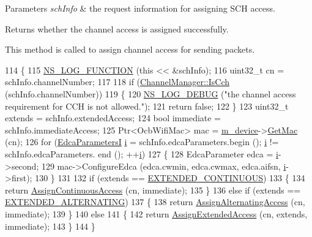 \begin{DoxyParams}{Parameters}
{\em sch\+Info} & the request information for assigning S\+CH access. \\
\hline
\end{DoxyParams}
\begin{DoxyReturn}{Returns}
whether the channel access is assigned successfully.
\end{DoxyReturn}
This method is called to assign channel access for sending packets. 
\begin{DoxyCode}
114 \{
115   \hyperlink{log-macros-disabled_8h_a90b90d5bad1f39cb1b64923ea94c0761}{NS\_LOG\_FUNCTION} (\textcolor{keyword}{this} << &schInfo);
116   uint32\_t cn = schInfo.channelNumber;
117 
118   \textcolor{keywordflow}{if} (\hyperlink{classns3_1_1ChannelManager_a3d68a3f8099eaa381bdfddac4b7ccfa6}{ChannelManager::IsCch} (schInfo.channelNumber))
119     \{
120       \hyperlink{group__logging_ga413f1886406d49f59a6a0a89b77b4d0a}{NS\_LOG\_DEBUG} (\textcolor{stringliteral}{"the channel access requirement for CCH is not allowed."});
121       \textcolor{keywordflow}{return} \textcolor{keyword}{false};
122     \}
123   uint32\_t extends = schInfo.extendedAccess;
124   \textcolor{keywordtype}{bool} immediate = schInfo.immediateAccess;
125   Ptr<OcbWifiMac> mac = \hyperlink{classns3_1_1ChannelScheduler_ac3d6c3071b8c796afb73789844968405}{m\_device}->\hyperlink{classns3_1_1WaveNetDevice_a899f670dd8eb023f0e40f19b536724eb}{GetMac} (cn);
126   \textcolor{keywordflow}{for} (\hyperlink{namespacens3_a0d8197f125c2e22b88fcd163ae1f30b1}{EdcaParametersI} \hyperlink{bernuolliDistribution_8m_a6f6ccfcf58b31cb6412107d9d5281426}{i} = schInfo.edcaParameters.begin (); \hyperlink{bernuolliDistribution_8m_a6f6ccfcf58b31cb6412107d9d5281426}{i} != schInfo.edcaParameters.
      end (); ++\hyperlink{bernuolliDistribution_8m_a6f6ccfcf58b31cb6412107d9d5281426}{i})
127     \{
128       EdcaParameter edca = \hyperlink{bernuolliDistribution_8m_a6f6ccfcf58b31cb6412107d9d5281426}{i}->second;
129       mac->ConfigureEdca (edca.cwmin, edca.cwmax, edca.aifsn, \hyperlink{bernuolliDistribution_8m_a6f6ccfcf58b31cb6412107d9d5281426}{i}->first);
130     \}
131 
132   \textcolor{keywordflow}{if} (extends == \hyperlink{channel-scheduler_8h_a51fe3e802b9451e2893d55d591047fc1}{EXTENDED\_CONTINUOUS})
133     \{
134       \textcolor{keywordflow}{return} \hyperlink{classns3_1_1ChannelScheduler_add316fb72a43d2ee22a55fef0c341a41}{AssignContinuousAccess} (cn, immediate);
135     \}
136   \textcolor{keywordflow}{else} \textcolor{keywordflow}{if} (extends == \hyperlink{channel-scheduler_8h_a0e1f74c3cb8f78904dd1ae957412392e}{EXTENDED\_ALTERNATING})
137     \{
138       \textcolor{keywordflow}{return} \hyperlink{classns3_1_1ChannelScheduler_af0271355fea052d70ea7f294815665e3}{AssignAlternatingAccess} (cn, immediate);
139     \}
140   \textcolor{keywordflow}{else}
141     \{
142       \textcolor{keywordflow}{return} \hyperlink{classns3_1_1ChannelScheduler_ae34d7ccddc8be5578dd6df92f95394d2}{AssignExtendedAccess} (cn, extends, immediate);
143     \}
144 \}
\end{DoxyCode}


